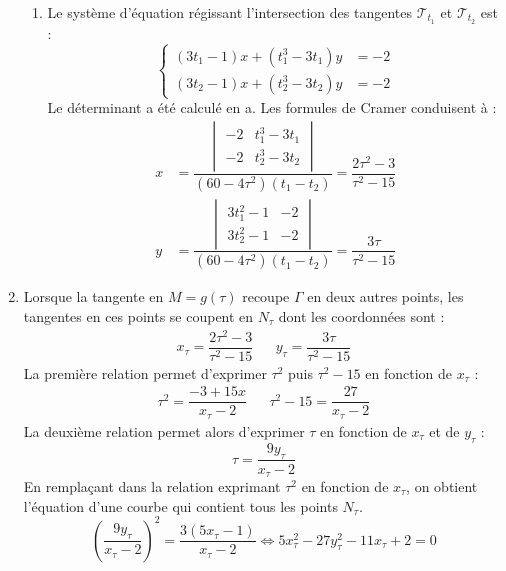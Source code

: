 \begin{enumerate}
\begin{enumerate}
\item Le système d'équation régissant l'intersection des tangentes $\mathcal T_{t_1}$ et $\mathcal T_{t_2}$ est :
\begin{equation*}
 \left\lbrace 
\begin{aligned}
 (3t_1 -1)x + (t_1^3 -3t_1)y &= -2 \\
(3t_2 -1)x + (t_2^3 -3t_2)y &= -2
\end{aligned}
\right. 
\end{equation*}
Le déterminant a été calculé en a. Les formules de Cramer conduisent à :
\begin{align*}
 x &= \dfrac
{
\begin{vmatrix}
 -2 & t_1^3 -3t_1\\
 -2 & t_2^3 -3t_2
\end{vmatrix}
}
{(60-4\tau^2)(t_1-t_2)}
 = \dfrac{2\tau^2 - 3}{\tau^2 - 15}\\
y &= \dfrac
{
\begin{vmatrix}
 3t_1^2 -1 & -2 \\
 3t_2^2 -1 & -2
\end{vmatrix}
}
{(60-4\tau^2)(t_1-t_2)}
= \dfrac{3\tau}{\tau^2-15}
\end{align*}
\end{enumerate}

\item Lorsque la tangente en $M=g(\tau)$ recoupe $\Gamma$ en deux autres points, les tangentes en ces points se coupent en $N_\tau$ dont les coordonnées sont :
\begin{align*}
  x_\tau = \dfrac{2\tau^2 - 3}{\tau^2 - 15}  & & y_\tau = \dfrac{3\tau}{\tau^2-15}
\end{align*}
La première relation permet d'exprimer $\tau^2$ puis $\tau^2 -15$ en fonction de $x_\tau$ :
\begin{align*}
 \tau^2 = \dfrac{-3+15x}{x_\tau-2} & & \tau^2 -15 = \dfrac{27}{x_\tau-2}
\end{align*}
La deuxième relation permet alors d'exprimer $\tau$ en fonction de $x_\tau$ et de $y_\tau$ :
\begin{displaymath}
 \tau = \dfrac{9y_\tau}{x_\tau-2}
\end{displaymath}
En remplaçant dans la relation exprimant $\tau^2$ en fonction de $x_\tau$, on obtient l'équation d'une courbe qui contient tous les points $N_\tau$.
\begin{equation*}
 \left( \dfrac{9y_\tau}{x_\tau-2}\right) ^2 = \dfrac{3(5x_\tau-1)}{x_\tau-2} \Leftrightarrow
5x_\tau^2 -27y_\tau^2 - 11x_\tau+2 =0
\end{equation*}


\end{enumerate}
